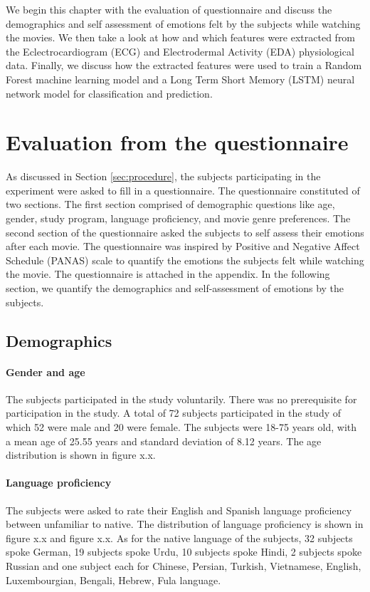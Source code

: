 We begin this chapter with the evaluation of questionnaire and discuss the demographics and self assessment of emotions felt by the subjects while watching the movies. We then take a look at how and which features were extracted from the Eclectrocardiogram (ECG) and Electrodermal Activity (EDA) physiological data. Finally, we discuss how the extracted features were used to train a Random Forest machine learning model and a Long Term Short Memory (LSTM) neural network model for classification and prediction.

\section{Evaluation from the questionnaire}
As discussed in Section \ref{sec:procedure}, the subjects participating in the experiment were asked to fill in a questionnaire. The questionnaire constituted of two sections. The first section comprised of demographic questions like age, gender, study program, language proficiency, and movie genre preferences. The second section of the questionnaire asked the subjects to self assess their emotions after each movie. The questionnaire was inspired by Positive and Negative Affect Schedule (PANAS) scale\cite{panas_crocker:1997} to quantify the emotions the subjects felt while watching the movie. The questionnaire is attached in the appendix. In the following section, we quantify the demographics and self-assessment of emotions by the subjects.
\subsection{Demographics}
\paragraph{Gender and age} The subjects participated in the study voluntarily. There was no prerequisite for participation in the study. A total of 72 subjects participated in the study of which 52 were male and 20 were female. The subjects were 18-75 years old, with a mean age of 25.55 years and standard deviation of 8.12 years. The age distribution is shown in figure x.x.

\paragraph{Language proficiency} The subjects were asked to rate their English and Spanish language proficiency between unfamiliar to native. The distribution of language proficiency is shown in figure x.x and figure x.x. As for the native language of the subjects, 32 subjects spoke German, 19 subjects spoke Urdu, 10 subjects spoke Hindi, 2 subjects spoke Russian and one subject each for Chinese, Persian, Turkish, Vietnamese, English, Luxembourgian, Bengali, Hebrew, Fula language.

